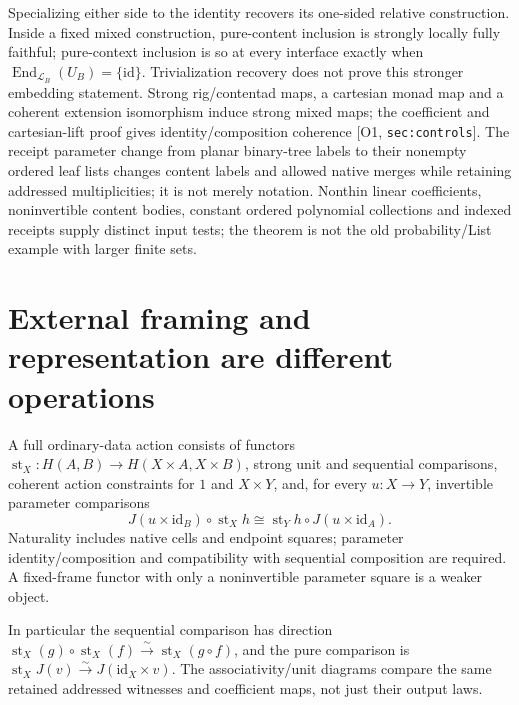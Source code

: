 \documentclass[11pt,a4paper]{article}
\theoremstyle{definition}
\newcommand{\id}{\mathrm{id}}
\newcommand{\Lc}{\mathcal L}
\newcommand{\st}{\operatorname{st}}
\newcommand{\Addr}[2]{\textup{[#1, \texttt{#2}]}}
\begin{document}
Specializing either side to the identity recovers its one-sided relative
construction. Inside a fixed mixed construction, pure-content inclusion
is strongly locally fully faithful; pure-context inclusion is so at every
interface exactly when \(\operatorname{End}_{\Lc_B}(U_B)=\{\id\}\).
Trivialization recovery does not prove this stronger embedding statement.
Strong rig/contentad maps, a cartesian monad map and a coherent extension
isomorphism induce strong mixed maps; the coefficient and cartesian-lift
proof gives identity/composition coherence \Addr{O1}{sec:controls}.
The receipt parameter change from planar binary-tree labels to their
nonempty ordered leaf lists changes content labels and allowed native
merges while retaining addressed multiplicities; it is not merely notation. Nonthin linear coefficients, noninvertible content
bodies, constant ordered polynomial collections and indexed receipts
supply distinct input tests; the theorem is not the old probability/List
example with larger finite sets.

\section{External framing and representation are different operations}\label{sec:frame}

A full ordinary-data action consists of functors
\(\st_X:H(A,B)\to H(X\times A,X\times B)\), strong unit and sequential
comparisons, coherent action constraints for \(1\) and \(X\times Y\),
and, for every \(u:X\to Y\), invertible parameter comparisons
\begin{equation}\label{eq:frame-param}
 J(u\times\id_B)\circ\st_Xh
       \cong\st_Yh\circ J(u\times\id_A).
\end{equation}
Naturality includes native cells and endpoint squares; parameter
identity/composition and compatibility with sequential composition are
required. A fixed-frame functor with only a noninvertible parameter square
is a weaker object.

In particular the sequential comparison has direction
\(\st_X(g)\circ\st_X(f)\xrightarrow{\sim}\st_X(g\circ f)\),
and the pure comparison is
\(\st_XJ(v)\xrightarrow{\sim}J(\id_X\times v)\).
The associativity/unit diagrams compare the same retained addressed
witnesses and coefficient maps, not just their output laws.
\end{document}
